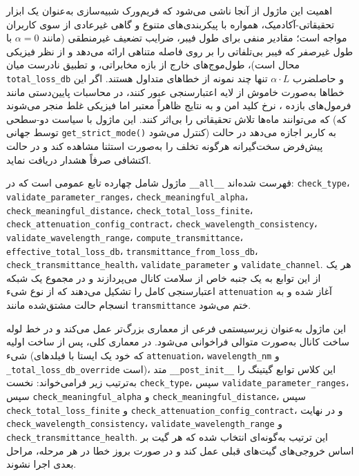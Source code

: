 اهمیت این ماژول از آنجا ناشی می‌شود که فریم‌ورک شبیه‌سازی  به‌عنوان یک ابزار تحقیقاتی-آکادمیک، همواره با پیکربندی‌های متنوع و گاهی غیرعادی از سوی کاربران مواجه است؛ مقادیر منفی برای طول فیبر، ضرایب تضعیف غیرمنطقی (مانند $\alpha=0$ با طول غیرصفر که فیبر بی‌تلفاتی را بر روی فاصله متناهی ارائه می‌دهد و از نظر فیزیکی محال است)، طول‌موج‌های خارج از بازه مخابراتی، و تطبیق نادرست میان \texttt{total\_loss\_db} و حاصلضرب $\alpha \cdot L$ تنها چند نمونه از خطاهای متداول هستند. اگر این خطاها به‌صورت خاموش از لایه اعتبارسنجی عبور کنند، در محاسبات پایین‌دستی مانند فرمول‌های بازده ، نرخ کلید امن و  به نتایج ظاهراً معتبر اما فیزیکی غلط منجر می‌شوند که می‌توانند ماه‌ها تلاش تحقیقاتی را بی‌اثر کنند. این ماژول با سیاست دو-سطحی  (که توسط  جهانی \texttt{get\_strict\_mode()} کنترل می‌شود) به کاربر اجازه می‌دهد در حالت پیش‌فرض سخت‌گیرانه هرگونه تخلف را به‌صورت استثنا مشاهده کند و در حالت اکتشافی  صرفاً هشدار دریافت نماید.

ماژول  شامل چهارده تابع عمومی است که در \texttt{\_\_all\_\_} فهرست شده‌اند: \texttt{check\_type}، \texttt{validate\_parameter\_ranges}، \texttt{check\_meaningful\_alpha}، \texttt{check\_meaningful\_distance}، \texttt{check\_total\_loss\_finite}، \texttt{check\_attenuation\_config\_contract}، \texttt{check\_wavelength\_consistency}، \texttt{validate\_wavelength\_range}، \texttt{compute\_transmittance}، \texttt{effective\_total\_loss\_db}، \texttt{transmittance\_from\_loss\_db}، \texttt{check\_transmittance\_health}، \texttt{validate\_parameter} و \texttt{validate\_channel}. هر یک از این توابع به یک جنبه خاص از سلامت کانال می‌پردازند و در مجموع یک شبکه اعتبارسنجی کامل را تشکیل می‌دهند که از نوع شیء \texttt{attenuation} آغاز شده و به انسجام حالت مشتق‌شده  مانند \texttt{transmittance} ختم می‌شود.

این ماژول به‌عنوان زیرسیستمی فرعی از معماری بزرگ‌تر  عمل می‌کند و در خط لوله ساخت کانال به‌صورت متوالی فراخوانی می‌شود. در معماری کلی، پس از ساخت اولیه شیء  (که خود یک  ایستا با فیلدهای \texttt{attenuation}، \texttt{wavelength\_nm} و \texttt{\_total\_loss\_db\_override} است)، متد \texttt{\_\_post\_init\_\_} این کلاس توابع گیتینگ را به‌ترتیب زیر فرامی‌خواند: نخست \texttt{check\_type}، سپس \texttt{validate\_parameter\_ranges}، سپس \texttt{check\_meaningful\_alpha} و \texttt{check\_meaningful\_distance}، سپس \texttt{check\_total\_loss\_finite} و \texttt{check\_attenuation\_config\_contract}، و در نهایت \texttt{check\_wavelength\_consistency}، \texttt{validate\_wavelength\_range} و \texttt{check\_transmittance\_health}. این ترتیب به‌گونه‌ای انتخاب شده که هر گیت بر اساس خروجی‌های گیت‌های قبلی عمل کند و در صورت بروز خطا در هر مرحله، مراحل بعدی اجرا نشوند.

